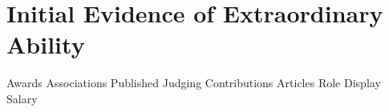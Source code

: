 \section{Initial Evidence of \mrls Extraordinary Ability}

{Awards}
{Associations}
{Published}
{Judging}
{Contributions}
{Articles}
{Role}
{Display}
{Salary}
